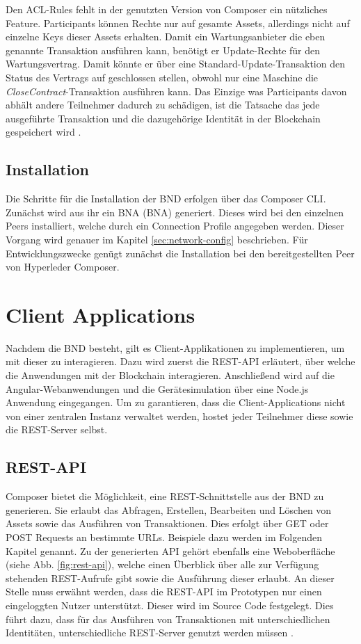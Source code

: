 Den ACL-Rules fehlt in der genutzten Version von Composer ein nützliches Feature. Participants können Rechte nur auf gesamte Assets, allerdings nicht auf einzelne Keys dieser Assets erhalten. Damit ein Wartungsanbieter die eben genannte Transaktion ausführen kann, benötigt er Update-Rechte für den Wartungsvertrag. Damit könnte er über eine Standard-Update-Transaktion den Status des Vertrags auf geschlossen stellen, obwohl nur eine Maschine die \textit{CloseContract}-Transaktion ausführen kann. Das Einzige was Participants davon abhält andere Teilnehmer dadurch zu schädigen, ist die Tatsache das jede ausgeführte Transaktion und die dazugehörige Identität in der Blockchain gespeichert wird \cite{SchererPerformanceScalabilityBlockchain2017}.

\subsection{Installation}
Die Schritte für die Installation der \acs{BND} erfolgen über das Composer CLI. Zunächst wird aus ihr ein \acl{BNA} (\acs{BNA}) generiert. Dieses wird bei den einzelnen Peers installiert, welche durch ein Connection Profile angegeben werden. Dieser Vorgang wird genauer im Kapitel \ref{sec:network-config} beschrieben. Für Entwicklungszwecke genügt zunächst die Installation bei den bereitgestellten Peer von Hyperleder Composer.

\section{Client Applications}
Nachdem die \acs{BND} besteht, gilt es Client-Applikationen zu implementieren, um mit dieser zu interagieren. Dazu wird zuerst die REST-API erläutert, über welche die Anwendungen mit der Blockchain interagieren. Anschließend wird auf die Angular-Webanwendungen und die Gerätesimulation über eine Node.js Anwendung eingegangen. Um zu garantieren, dass die Client-Applications nicht von einer zentralen Instanz verwaltet werden, hostet jeder Teilnehmer diese sowie die REST-Server selbst.

\subsection{REST-API}
\label{subsec:REST}
Composer bietet die Möglichkeit, eine REST-Schnittstelle aus der \acs{BND} zu generieren. Sie erlaubt das Abfragen, Erstellen, Bearbeiten und Löschen von Assets sowie das Ausführen von Transaktionen. Dies erfolgt über GET oder POST Requests an bestimmte URLs. Beispiele dazu werden im Folgenden Kapitel genannt. Zu der generierten API gehört ebenfalls eine Weboberfläche (siehe Abb. \ref{fig:rest-api}), welche einen Überblick über alle zur Verfügung stehenden REST-Aufrufe gibt sowie die Ausführung dieser erlaubt. An dieser Stelle muss erwähnt werden, dass die REST-API im Prototypen nur einen eingeloggten Nutzer unterstützt. Dieser wird im Source Code festgelegt. Dies führt dazu, dass für das Ausführen von Transaktionen mit unterschiedlichen Identitäten, unterschiedliche REST-Server genutzt werden müssen \cite{HyperledgerComposerTeamRESTAPIHyperledger}.

